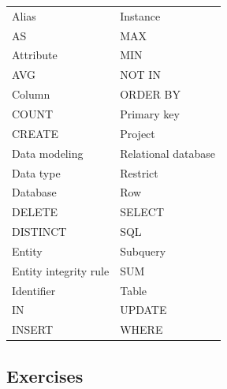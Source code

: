 \documentclass[
]{article}
\begin{document}
\begin{longtable}[]{@{}ll@{}}
\toprule
& \\
\midrule
\endhead
Alias & Instance \\
AS & MAX \\
Attribute & MIN \\
AVG & NOT IN \\
Column & ORDER BY \\
COUNT & Primary key \\
CREATE & Project \\
Data modeling & Relational database \\
Data type & Restrict \\
Database & Row \\
DELETE & SELECT \\
DISTINCT & SQL \\
Entity & Subquery \\
Entity integrity rule & SUM \\
Identifier & Table \\
IN & UPDATE \\
INSERT & WHERE \\
\bottomrule
\end{longtable}

\hypertarget{exercises-2}{%
\subsection*{Exercises}\label{exercises-2}}
\end{document}
